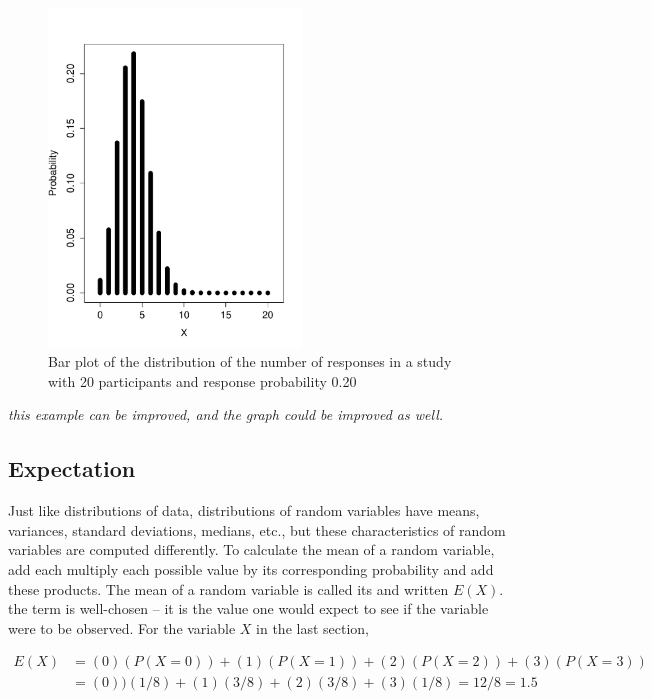 \begin{doublespace}
\begin{figure}[h]
\centering
\includegraphics[width=0.60\textwidth]
{ch_probability_oi_biostat/figures/distRespClinStudy/distRespClinStudy.pdf}
\caption{Bar plot of the distribution of the number of responses in a study with 20 participants and response probability 0.20}
\label{disRespClinStudy}
\end{figure}

 \textit{this example can be improved, and the graph could be improved as well.}


\subsection{Expectation}


Just like distributions of data, distributions of random variables have means, variances, standard deviations, medians, etc., but these characteristics of random variables are computed differently.  To calculate the mean of a random variable, add each multiply each possible value by its corresponding probability and add these products.  The mean of a random variable is called its  and written $E(X)$. the term is well-chosen -- it is the value one would expect to see if the variable were to be observed. For the variable $X$ in the last section,

\begin{align*}
E(X) &= (0)(P(X=0)) + (1)(P(X=1)) + (2)(P(X=2)) + (3)(P(X = 3)) \\
	&= (0))(1/8) + (1)(3/8) + (2)(3/8) + (3)(1/8) = 12/8 = 1.5
\end{align*}


\end{doublespace}
